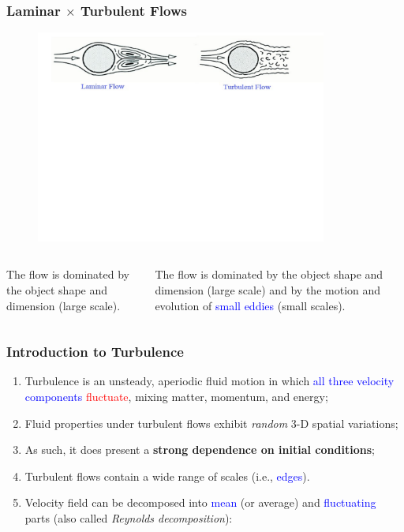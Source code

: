 \documentclass[10pt,compress]{beamer}
\newcommand{\red}{\textcolor{red}}
\newcommand{\blue}{\textcolor{blue}}
\begin{document}
\begin{frame}
 \frametitle{Laminar $\times$ Turbulent Flows}
   \begin{figure}%
    \begin{center}
     \includegraphics[width=9.cm, height=7cm, clip]{./Figs/Transition2Turbulence2b}
    \end{center}
   \end{figure}    
  \vspace{-5cm}
  \begin{columns}
    \begin{column}[l]{0.5\linewidth}
        The flow is dominated by the object shape and dimension (large scale).
    \end{column}
    \begin{column}[l]{0.5\linewidth}
      The flow is dominated by the object shape and dimension (large scale) and by the motion and evolution of \blue{small eddies} (small scales).
    \end{column}
  \end{columns}

\end{frame}


\begin{frame}
 \frametitle{Introduction to Turbulence}
   \begin{enumerate}
      \item<1-> Turbulence is an unsteady, aperiodic fluid motion in which \blue{all three velocity components} \red{fluctuate}, mixing matter, momentum, and energy;
      \item<1-> Fluid properties under turbulent flows exhibit {\it random} 3-D spatial variations;
      \item<1-> As such, it does present a {\bf strong dependence on initial conditions};
      \item<1-> Turbulent flows contain a wide range of scales (i.e., \blue{edges}).
      \item<2-> Velocity field can be decomposed into \blue{mean} (or average) and \blue{fluctuating} parts (also called {\it Reynolds decomposition}):
   \end{enumerate}
\end{frame}
\end{document}

